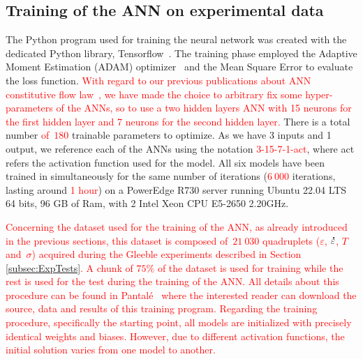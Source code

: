 \documentclass[algorithms,article,submit,pdftex,oneauthors]{Definitions/mdpi}
\DeclareRobustCommand{\mdot}[1]{\accentset{\mbox{\bfseries .}}{#1}}
\begin{document}
\subsection{Training of the ANN on experimental data}\label{subsec:train}

The Python program used for training the neural network was created with the dedicated Python library, Tensorflow~\cite{Tensorflow-2015}.
The training phase employed the Adaptive Moment Estimation (ADAM) optimizer~\cite{Kingma-2015-AMS} and the Mean Square Error to evaluate the loss function.
\textcolor{red}{With regard to our previous publications about ANN constitutive flow law~\cite{Pantale-2021-EIN}, we have made the choice to arbitrary fix some hyper-parameters of the ANNs, so to use a two hidden layers ANN with 15 neurons for the first hidden layer and 7 neurons for the second hidden layer.}
There is a total number \textcolor{red}{of~$180$} trainable parameters to optimize.
As we have 3 inputs and 1 output, we reference each of the ANNs using the notation \textcolor{red}{3-15-7-1-act}, where act refers the activation function used for the model.
All six models have been trained in simultaneously for the same number of iterations (\textcolor{red}{$6~000$} iterations, lasting around \textcolor{red}{1 hour}) on a PowerEdge R730 server running Ubuntu 22.04 LTS 64 bits, 96 GB of Ram, with 2 Intel Xeon CPU E5-2650 2.20GHz.

\textcolor{red}{Concerning the dataset used for the training of the ANN, as already introduced in the previous sections, this dataset is composed of~$21~030$ quadruplets ($\varepsilon$, $\mdot{\varepsilon}$, $T$ and~$\sigma$) acquired during the Gleeble experiments described in Section \ref{subsec:ExpTests}.
A chunk of $75\%$ of the dataset is used for training while the rest is used for the test during the training of the ANN.
All details about this procedure can be found in Pantalé~\cite{Pantale-2023-SSF} where the interested reader can download the source, data and results of this training program.}
\textcolor{red}{Regarding the training procedure, specifically the starting point, all models are initialized with precisely identical weights and biases.
However, due to different activation functions, the initial solution varies from one model to another.}
\end{document}
